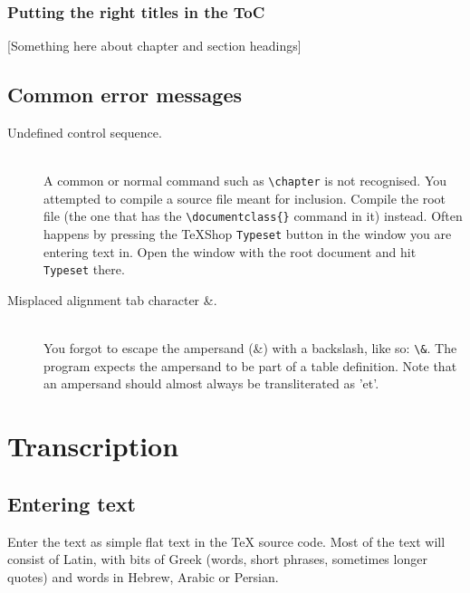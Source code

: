 \documentclass{report}
\begin{document}
\subsection{Putting the right titles in the ToC}
[Something here about chapter and section headings]

\section{Common error messages}
\begin{description}
\item[Undefined control sequence.] \hfill \\
A common or normal command such as \verb;\chapter;
is not recognised. You attempted to compile a source file meant for inclusion. Compile the root file (the one that has the \verb;\documentclass{}; command in it) instead. Often happens by pressing the TeXShop \texttt{Typeset} button in the window you are entering text in. Open the window with the root document and hit \texttt{Typeset} there.

\item[Misplaced alignment tab character \&.] \hfill \\
You forgot to escape the ampersand (\&) with a backslash, like so: \verb;\&;.
The program expects the ampersand to be part of a table definition.
Note that an ampersand should almost always be transliterated as 'et'.
\end{description}


\chapter{Transcription}

\section{Entering text}

Enter the text as simple flat text in the \TeX{} source code.
Most of the text will consist of Latin,
with bits of Greek (words, short phrases, sometimes longer quotes) and words
in Hebrew, Arabic or Persian.
\end{document}
